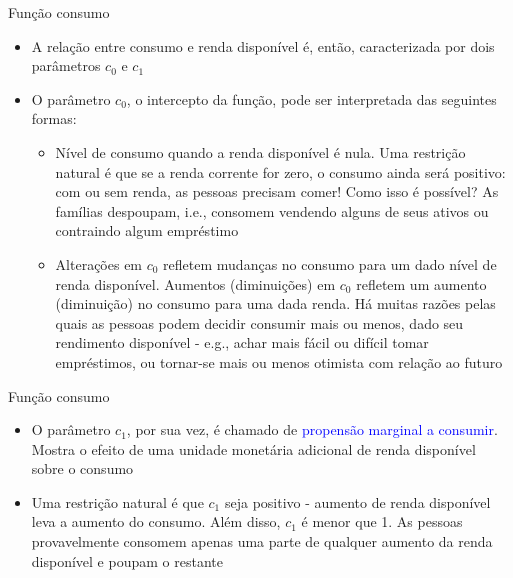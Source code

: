\documentclass[10pt]{beamer}
\begin{document}
\begin{frame}{Função consumo}
    \begin{itemize}
        \item A relação entre consumo e renda disponível é, então, caracterizada por dois parâmetros $c_0$ e $c_1$\bigskip
         
        \item O parâmetro $c_0$, o intercepto da função, pode ser interpretada das seguintes formas:\bigskip
         
        \begin{itemize}
            \item Nível de consumo quando a renda disponível é nula. Uma restrição natural é que se a renda corrente for zero, o consumo ainda será positivo: com ou sem renda, as pessoas precisam comer! Como isso é possível? As famílias despoupam, i.e., consomem vendendo alguns de seus ativos ou contraindo algum empréstimo\medskip
             
            \item Alterações em $c_0$ refletem mudanças no consumo para um dado nível de renda disponível. Aumentos (diminuições) em $c_0$ refletem um aumento (diminuição) no consumo para uma dada renda. Há muitas razões pelas quais as pessoas podem decidir consumir mais ou menos, dado seu rendimento disponível - e.g., achar mais fácil ou difícil tomar empréstimos, ou tornar-se mais ou menos otimista com relação ao futuro
        \end{itemize}
    \end{itemize}
\end{frame}

\begin{frame}{Função consumo}
\begin{itemize}
    \item O parâmetro $c_1$, por sua vez, é chamado de \textcolor{blue}{propensão marginal a consumir}. Mostra o efeito de uma unidade monetária adicional de renda disponível sobre o consumo\bigskip
     
    \item Uma restrição natural é que $c_1$ seja positivo - aumento de renda disponível leva a aumento do consumo. Além disso, $c_1$ é menor que 1. As pessoas provavelmente consomem apenas uma parte de qualquer aumento da renda disponível e poupam o restante
\end{itemize}
\end{frame}
\end{document}
